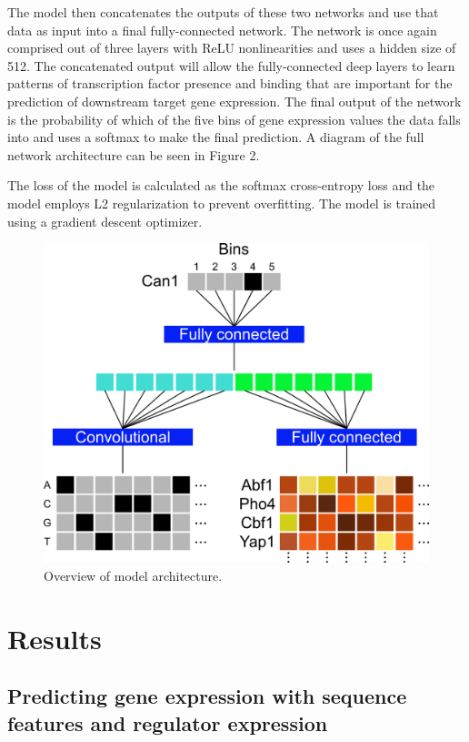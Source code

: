 \documentclass{article}
\begin{document}
The model then concatenates the outputs of these two networks and use that data as input into a final fully-connected network. The network is once again comprised out of three layers with ReLU nonlinearities and uses a hidden size of 512. The concatenated output will allow the fully-connected deep layers to learn patterns of transcription factor presence and binding that are important for the prediction of downstream target gene expression. The final output of the network is the probability of which of the five bins of gene expression values the data falls into and uses a softmax to make the final prediction. A diagram of the full network architecture can be seen in Figure 2.
 
The loss of the model is calculated as the softmax cross-entropy loss and the model employs L2 regularization to prevent overfitting. The model is trained using a gradient descent optimizer.	
	
	\begin{figure}[H]
	\begin{center}
	\includegraphics[scale=0.5]{fig/Architecture}
	\end{center}
	\caption{Overview of model architecture.}
	\end{figure}
	

\section{Results}

\subsection{Predicting gene expression with sequence features and regulator expression}
\end{document}
